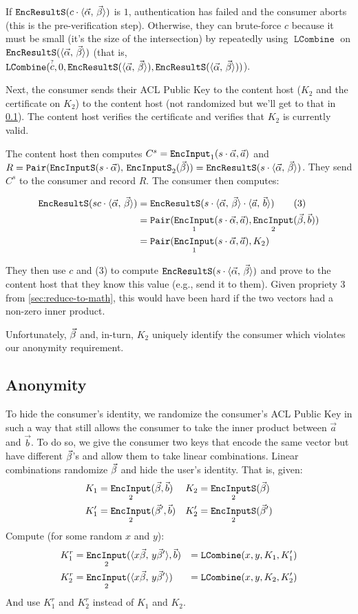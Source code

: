 \documentclass[pdftex,12pt,a4papaer,twoside,notitlepage]{report}
\newcommand{\iprod}[2]{\langle #1,\,#2\rangle}
\DeclareMathOperator{\ein}{\mathtt{EncInput}}
\DeclareMathOperator{\combine}{\mathtt{LCombine}}
\DeclareMathOperator{\eins}{\mathtt{EncInputS}}
\DeclareMathOperator{\eouts}{\mathtt{EncResultS}}
\DeclareMathOperator{\pair}{\mathtt{Pair}}
\begin{document}
If $\eouts(c \cdot \ABp)$ is $1$, authentication has failed and the consumer
aborts (this is the pre-verification step). Otherwise, they can brute-force $c$
because it must be small (it's the size of the intersection) by repeatedly using
$\combine$ on $\eouts(\ABp)$ (that is, $\combine(\stackrel{\text{\tiny ?}}{c}, 0, \eouts(\ABp),
\eouts(\ABp))$).

Next, the consumer sends their ACL Public Key to the content host ($K_2$ and the
certificate on $K_2$) to the content host (not randomized but we'll get to that
in \cref{sec:anon-crypto}). The content host verifies the certificate and
verifies that $K_2$ is currently valid.

The content host then computes $C^s = \ein_1(s\cdot\Ap, \vec{a})$ and $R =
\pair(\eins(s\cdot \Ap),\,\eins_2(\Bp)) = \eouts(s\cdot \ABp)$. They send $C^s$
to the consumer and record $R$. The consumer then computes:

\begin{align*}
  \eouts(sc \cdot \ABp) &= \eouts(s \cdot \ABp \cdot \iprod{\vec{a}}{\vec{b}}) \tag{3} \\
                        &= \pair(\ein_1(s \cdot \Ap, \vec{a}), \ein_2(\Bp, \vec{b})) \\
                        &= \pair(\ein_1(s \cdot \Ap, \vec{a}), K_2) \\
\end{align*}

They then use $c$ and (3) to compute $\eouts(s\cdot\ABp)$ and prove to the
content host that they know this value (e.g., send it to them). Given propriety
3 from \cref{sec:reduce-to-math}, this would have been hard if the two vectors
had a non-zero inner product.

Unfortunately, $\vec{\beta}$ and, in-turn, $K_2$ uniquely identify the consumer which
violates our anonymity requirement.

\subsection{Anonymity}
\label{sec:anon-crypto}

To hide the consumer's identity, we randomize the consumer's ACL Public Key in
such a way that still allows the consumer to take the inner product between
$\vec{a}$ and $\vec{b}$. To do so, we give the consumer two keys that encode the
same vector but have different $\vec{\beta}$'s and allow them to take linear
combinations. Linear combinations randomize $\vec{\beta}$ and hide the user's identity.
That is, given:
\begin{align*}
  K_1 &= \ein_2(\Bp, \vec{b}) & K_2 &= \eins_2(\Bp) \\
  K^\prime_1 &= \ein_2(\Bp^\prime, \vec{b}) & K^\prime_2 &= \eins_2(\Bp^\prime)
\end{align*}
Compute (for some random $x$ and $y$):
\begin{align*}
  K^r_1 &= \ein_2(\iprod{x\Bp}{y\Bp^\prime}, \vec{b}) &= \combine(x, y, K_1, K_1^\prime) \\
  K^r_2 &= \ein_2(\iprod{x\Bp}{y\Bp^\prime}) &= \combine(x, y, K_2, K_2^\prime) \\
\end{align*}
And use $K_1^r$ and $K_2^r$ instead of $K_1$ and $K_2$.
\end{document}
